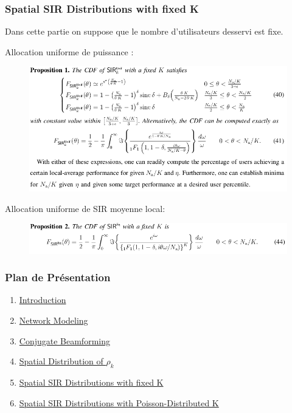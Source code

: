 \documentclass[pdf]{beamer}
\begin{document}
\begin{frame}[label=spatialsir]
\frametitle{Spatial SIR Distributions with fixed K}
Dans cette partie on suppose que le nombre d'utilisateurs desservi est fixe.\begin{exampleblock}{Allocation uniforme de puissance :}
\justify
\begin{figure}
	\includegraphics[width=0.7\linewidth]{1}
\end{figure}
\end{exampleblock}
\begin{exampleblock}{Allocation uniforme de SIR moyenne local:}
\justify
\begin{figure}
	\includegraphics[width=1\linewidth]{2}
\end{figure}
\end{exampleblock}
\end{frame}

\begin{frame}
\frametitle{Plan de Présentation }
\begin{enumerate}
	\item \hyperlink{Introduction}{Introduction}
	\item \hyperlink{networkModeling}{Network Modeling}
	\item \hyperlink{conjugateBeamforming}{Conjugate Beamforming}
	\item \hyperlink{spatialDistribution}{Spatial Distribution of $\rho_k$}
	\item \hyperlink{spatialsir}{Spatial SIR Distributions with fixed K}
	\item \hyperlink{spatialsirk}{Spatial SIR Distributions with Poisson-Distributed K}
\end{enumerate}
\end{frame}
\end{document}
